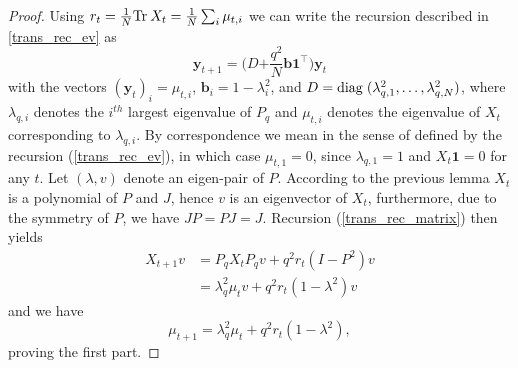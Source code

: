 \documentclass[a4paper,12pt]{article}
\def\dg{\mathrm{diag}\hspace{1mm}}
\def\tr{\mathrm{Tr}\hspace{0.8mm}}
\begin{document}
\begin{proof}	
	Using $r_t = \frac 1N \tr X_t = \frac1N \sum_i \mu_{t,i}$ we can write the recursion described in \eqref{trans_rec_ev} as
	\begin{equation} \label{trans_rec} \boldsymbol y_{t+1} = \bigg(D\mathbf + \frac{q^2}N \mathbf b \mathbf 1^\top\bigg)\boldsymbol{y}_t 
	\end{equation}
	with the vectors $(\boldsymbol{y}_t)_{i} = \mu_{t,i} $, $\mathbf b_i = 1-\lambda_{i}^2$, and $D=\dg (\lambda_{q,1}^2,\ldots,\lambda_{q,N}^2)$, where $\lambda_{q,i}$ denotes the $i^{th}$ largest eigenvalue of $P_q$ and $\mu_{t,i}$ denotes the eigenvalue of $X_t$ corresponding to $\lambda_{q,i}$. By correspondence we mean in the sense of defined by the recursion (\ref{trans_rec_ev}), in which case $\mu_{t,1} = 0$, since $\lambda_{q,1} = 1$ and $X_t \mathbf 1 = 0$ for any $t$.
	Let $(\lambda,v)$ denote an eigen-pair of $P$. According to the previous lemma $X_t $ is a polynomial of $P$ and $J$, hence $v$ is an eigenvector of $X_t$, furthermore, due to the symmetry of $P$, we have $JP=PJ=J$. Recursion (\ref{trans_rec_matrix}) then yields
	\begin{align*}
		X_{t+1} v &= P_qX_t P_q v + q^2 r_t(I-P^2)v \\
		& = \lambda_q^2 \mu_t v + q^2 r_t(1-\lambda^2)v	
	\end{align*} 
	and we have 
	$$ \mu_{t+1} = \lambda_q^2\mu_t + q^2 r_t(1-\lambda^2), $$
	proving the first part.
	

\end{proof}
\end{document}
